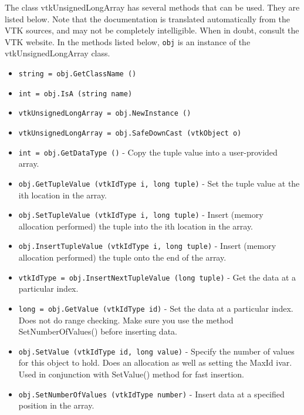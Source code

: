 The class vtkUnsignedLongArray has several methods that can be used.
  They are listed below.
Note that the documentation is translated automatically from the VTK sources,
and may not be completely intelligible.  When in doubt, consult the VTK website.
In the methods listed below, \verb|obj| is an instance of the vtkUnsignedLongArray class.
\begin{itemize}
\item  \verb|string = obj.GetClassName ()|

\item  \verb|int = obj.IsA (string name)|

\item  \verb|vtkUnsignedLongArray = obj.NewInstance ()|

\item  \verb|vtkUnsignedLongArray = obj.SafeDownCast (vtkObject o)|

\item  \verb|int = obj.GetDataType ()| -  Copy the tuple value into a user-provided array.

\item  \verb|obj.GetTupleValue (vtkIdType i, long tuple)| -  Set the tuple value at the ith location in the array.

\item  \verb|obj.SetTupleValue (vtkIdType i, long tuple)| -  Insert (memory allocation performed) the tuple into the ith location
 in the array.

\item  \verb|obj.InsertTupleValue (vtkIdType i, long tuple)| -  Insert (memory allocation performed) the tuple onto the end of the array.

\item  \verb|vtkIdType = obj.InsertNextTupleValue (long tuple)| -  Get the data at a particular index.

\item  \verb|long = obj.GetValue (vtkIdType id)| -  Set the data at a particular index. Does not do range checking. Make sure
 you use the method SetNumberOfValues() before inserting data.

\item  \verb|obj.SetValue (vtkIdType id, long value)| -  Specify the number of values for this object to hold. Does an
 allocation as well as setting the MaxId ivar. Used in conjunction with
 SetValue() method for fast insertion.

\item  \verb|obj.SetNumberOfValues (vtkIdType number)| -  Insert data at a specified position in the array.


\end{itemize}
